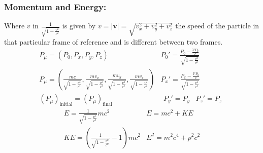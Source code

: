 \documentclass{article}
\begin{document}
	\subsubsection*{Momentum and Energy:} Where $v$ in $\frac{1}{\sqrt{1-\frac{v^2}{c^2}}}$ is given by $v=|\mathbf{v}|=\sqrt{v_x^2+v_y^2+v_z^2}$ the speed of the particle in that particular frame of reference and is different between two frames.
	\[
		\begin{array}{c|c}
		P_{\mu} = \left(P_0,P_x,P_y,P_z\right)	& P_0' = \frac{P_0-\frac{\mathcal{V} P_x}{c}}{\sqrt{1-\frac{v^2}{c^2}}} \\ 
		P_{\mu} = \left(\frac{mc}{\sqrt{1-\frac{v^2}{c^2}}}, \frac{mv_x}{\sqrt{1-\frac{v^2}{c^2}}}, \frac{mv_y}{\sqrt{1-\frac{v^2}{c^2}}}, \frac{mv_z}{\sqrt{1-\frac{v^2}{c^2}}}\right)	&	P_x' = \frac{P_x-\frac{\mathcal{V} P_0}{c}}{\sqrt{1-\frac{v^2}{c^2}}} \\ 
		\left(P_{\mu}\right)_{\text{initial}} = \left(P_{\mu}\right)_{\text{final}}	& \begin{array}{cc} P_y' = P_y & P_z' = P_z \end{array}
		\end{array}
	\]
	\[	
		\begin{array}{c|c}
		E=\frac{1}{\sqrt{1-\frac{v^2}{c^2}}} mc^2	& E=mc^2+KE \\ 
		KE=\left(\frac{1}{\sqrt{1-\frac{v^2}{c^2}}}-1\right) mc^2	& E^2=m^2c^4+p^2c^2
		\end{array} 
	\]
	
	
	
	
	
\end{document}

